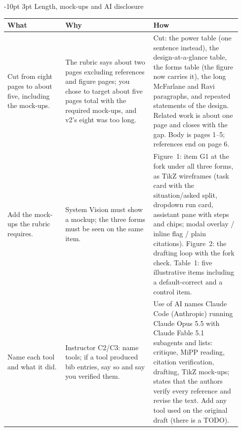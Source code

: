 \documentclass[9pt,letterpaper]{extarticle}
\makeatletter
\newcommand{\rowsep}{\noalign{\vskip 1.5pt}\arrayrulecolor{black!35}\hline\arrayrulecolor{black}\noalign{\vskip 1.5pt}}
\renewcommand\section{\@startsection{section}{1}{\z@}%
  {-10pt \@plus -2pt \@minus -1pt}{3pt}%
  {\sffamily\bfseries\large\color{accent}}}
\let\oldsection\section
\renewcommand{\section}{\needspace{7\baselineskip}\oldsection}
\newcommand{\wwh}{\toprule
\sffamily\bfseries\color{accent} What & \sffamily\bfseries\color{accent} Why & \sffamily\bfseries\color{accent} How \\
\midrule}
\newenvironment{wwhtable}{\footnotesize
\begin{longtable}{@{}>{\raggedright\arraybackslash}p{0.23\linewidth}>{\raggedright\arraybackslash}p{0.355\linewidth}>{\raggedright\arraybackslash}p{0.355\linewidth}@{}}
\wwh}{\bottomrule\end{longtable}}
\makeatother
\begin{document}
\section{Length, mock-ups and AI disclosure}
\begin{wwhtable}
Cut from eight pages to about five, including the mock-ups. &
The rubric says about two pages excluding references and figure pages; you
chose to target about five pages total with the required mock-ups, and v2's
eight was too long. &
Cut: the power table (one sentence instead), the design-at-a-glance table,
the forms table (the figure now carries it), the long McFarlane and Ravi
paragraphs, and repeated statements of the design. Related work is about one
page and closes with the gap. Body is pages 1--5; references end on page 6. \\
\rowsep
Add the mock-ups the rubric requires. &
System Vision must show a mockup; the three forms must be seen on the same
item. &
Figure~1: item G1 at the fork under all three forms, as TikZ wireframes (task
card with the situation/asked split, dropdown run card, assistant pane with
steps and chips; modal overlay / inline flag / plain citations). Figure~2: the
drafting loop with the fork check. Table~1: five illustrative items including
a default-correct and a control item. \\
\rowsep
Name each tool and what it did. &
Instructor C2/C3: name tools; if a tool produced bib entries, say so and say
you verified them. &
Use of AI names Claude Code (Anthropic) running Claude Opus 5.5 with Claude
Fable 5.1 subagents and lists: critique, MiPP reading, citation verification,
drafting, TikZ mock-ups; states that the authors verify every reference and
revise the text. Add any tool used on the original draft (there is a TODO). \\
\end{wwhtable}
\end{document}
